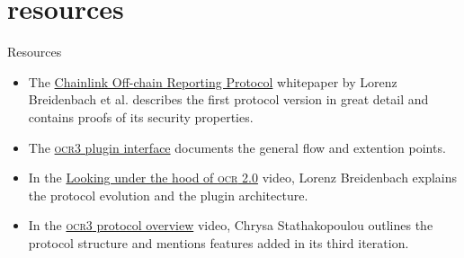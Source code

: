 \documentclass{article}
\begin{document}
\section{resources}{Resources}

\begin{itemize}
    \item The \href{https://research.chain.link/ocr.pdf}{Chainlink Off-chain Reporting Protocol} whitepaper by Lorenz Breidenbach et al. describes the first protocol version in great detail and contains proofs of its security properties.
    \item The \href{https://github.com/smartcontractkit/libocr/blob/6359502d2ff1165c7e6b77b9eff2c5a46a7a4fbb/offchainreporting2plus/ocr3types/plugin.go#L94}{\textsc{ocr3} plugin interface} documents the general flow and extention points.
    \item In the \href{https://youtu.be/XKiLkmwVaYA}{Looking under the hood of \textsc{ocr} 2.0} video, Lorenz Breidenbach explains the protocol evolution and the plugin architecture.
    \item In the \href{https://youtu.be/VPVH3QCwc0U}{\textsc{ocr3} protocol overview} video, Chrysa Stathakopoulou outlines the protocol structure and mentions features added in its third iteration.
\end{itemize}
\end{document}
